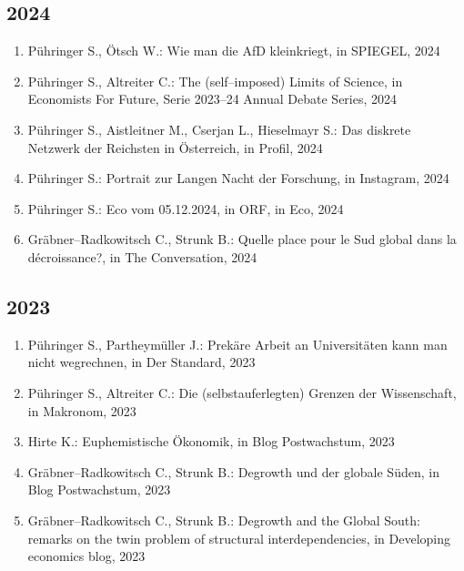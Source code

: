\subsection*{2024}
\begin{enumerate}
    	 \item Pühringer S., Ötsch W.: Wie man die AfD kleinkriegt, in SPIEGEL, 2024
	 \item Pühringer S., Altreiter C.: The (self--imposed) Limits of Science, in Economists For Future, Serie 2023--24 Annual Debate Series, 2024
	 \item Pühringer S., Aistleitner M., Cserjan L., Hieselmayr S.: Das diskrete Netzwerk der Reichsten in Österreich, in Profil, 2024
	 \item Pühringer S.: Portrait zur Langen Nacht der Forschung, in Instagram, 2024
	 \item Pühringer S.: Eco vom 05.12.2024, in ORF, in Eco, 2024
	 \item Gräbner--Radkowitsch C., Strunk B.: Quelle place pour le Sud global dans la décroissance?, in The Conversation, 2024
\end{enumerate}
\subsection*{2023}
\begin{enumerate}
    	 \item Pühringer S., Partheymüller J.: Prekäre Arbeit an Universitäten kann man nicht wegrechnen, in Der Standard, 2023
	 \item Pühringer S., Altreiter C.: Die (selbstauferlegten) Grenzen der Wissenschaft, in Makronom, 2023
	 \item Hirte K.: Euphemistische Ökonomik, in Blog Postwachstum, 2023
	 \item Gräbner--Radkowitsch C., Strunk B.: Degrowth und der globale Süden, in Blog Postwachstum, 2023
	 \item Gräbner--Radkowitsch C., Strunk B.: Degrowth and the Global South: remarks on the twin problem of structural interdependencies, in Developing economics blog, 2023
\end{enumerate}
